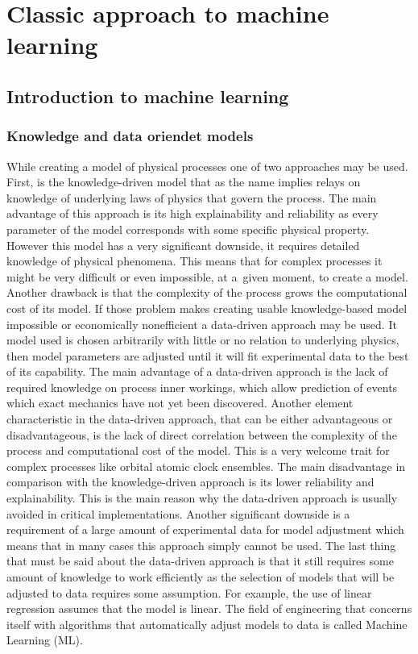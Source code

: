 \chapter{Classic approach to machine learning}


\section{Introduction to machine learning}

\subsection{Knowledge and data oriendet models}
While creating a model of physical processes one of two approaches may be used.
First, is the knowledge-driven model that as the name implies relays on knowledge of underlying
laws of physics that govern the process.
The main advantage of this approach is its high explainability and reliability as every parameter
of the model corresponds with some specific physical property.
However this model has a very significant downside, it requires detailed knowledge of physical
phenomena. This means that for complex processes it might be very difficult or even
impossible, at a~given moment, to create a model. Another drawback is that the complexity of
the process grows the computational cost of its model.
If those problem makes creating usable knowledge-based model impossible or economically
nonefficient a data-driven approach may be used.
It model used is chosen arbitrarily with little or no relation to underlying physics,
then model parameters are adjusted until it will fit experimental data to the best of its
capability.
The main advantage of a data-driven approach is the lack of required knowledge on process 
inner workings, which allow prediction of events which exact mechanics have not 
yet been discovered.
Another element characteristic in the data-driven approach, that can be either advantageous or
disadvantageous, is the lack of direct correlation between the complexity 
of the process and computational cost of the model.
This is a very welcome trait for complex processes like orbital atomic clock ensembles.
The main disadvantage in comparison with the knowledge-driven approach is its lower reliability and
explainability. This is the main reason why the data-driven approach is usually avoided in
critical implementations. Another significant downside is a requirement of a large amount of
experimental data for model adjustment which means that in many cases this approach simply
cannot be used.
The last thing that must be said about the data-driven approach is that it still requires some
amount of knowledge to work efficiently as the selection of models that will be adjusted to
data requires some assumption. For example, the use of linear regression assumes that the model
is linear. The field of engineering that concerns itself with algorithms that automatically
adjust models to data is called Machine Learning (ML).

